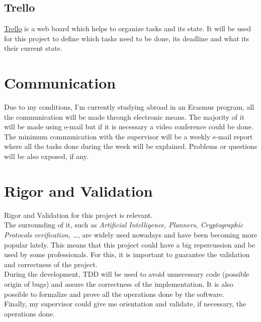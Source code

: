 \subsection{Trello}
\href{https://trello.com}{Trello} is a web board which helps to organize tasks and its state. It will be used for this project to define which tasks need to be done, its deadline and what its their current state. 

\section{Communication}
Due to my conditions, I'm currently studying abroad in an Erasmus program, all the communication will be made through electronic means. The majority of it will be made using e-mail but if it is necessary a video conference could be done. \\
The minimum communication with the supervisor will be a weekly e-mail report where all the tasks done during the week will be explained. Problems or questions will be also exposed, if any.

\section{Rigor and Validation}
Rigor and Validation for this project is relevant. \\
The surrounding of it, such as \emph{Artificial Intelligence, Planners, Cryptographic Protocols verification, \ldots}, are widely used nowadays and have been becoming more popular lately. This means that this project could have a big repercussion and be used by some professionals. For this, it is important to guarantee the validation and correctness of the project. \\
During the development, TDD will be used to avoid unnecessary code (possible origin of bugs) and assure the correctness of the implementation. It is also possible to formalize and prove all the operations done by the software.\\
Finally, my supervisor could give me orientation and validate, if necessary, the operations done.